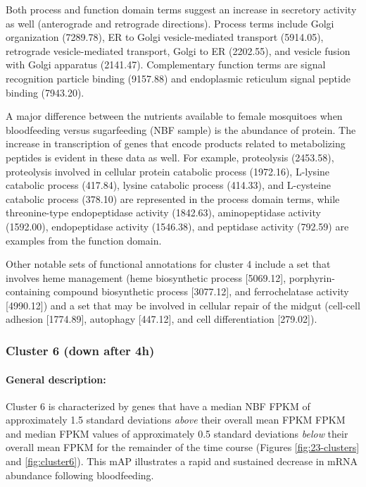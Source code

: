 Both process and function domain terms suggest an increase in secretory activity as well (anterograde and retrograde directions).
%
Process terms include Golgi organization (7289.78), ER to Golgi vesicle-mediated transport (5914.05), retrograde vesicle-mediated transport, Golgi to ER (2202.55), and vesicle fusion with Golgi apparatus (2141.47).
%
Complementary function terms are signal recognition particle binding (9157.88) and endoplasmic reticulum signal peptide binding (7943.20).

A major difference between the nutrients available to female mosquitoes when bloodfeeding versus sugarfeeding (\gls{NBF} sample) is the abundance of protein.
%
The increase in transcription of genes that encode products related to metabolizing peptides is evident in these data as well.
%
For example, proteolysis (2453.58), proteolysis involved in cellular protein catabolic process (1972.16), L-lysine catabolic process (417.84), lysine catabolic process (414.33), and L-cysteine catabolic process (378.10) are represented in the process domain terms, while threonine-type endopeptidase activity (1842.63), aminopeptidase activity (1592.00), endopeptidase activity (1546.38), and peptidase activity (792.59) are examples from the function domain.

Other notable sets of functional annotations for cluster 4 include a set that involves heme management (heme biosynthetic process [5069.12], porphyrin-containing compound biosynthetic process [3077.12], and ferrochelatase activity [4990.12]) and a set that may be involved in cellular repair of the midgut (cell-cell adhesion [1774.89], autophagy [447.12], and cell differentiation [279.02]).







\subsubsection{Cluster 6 (down after 4h)}

\paragraph*{General description:}

Cluster 6 is characterized by genes that have a median \gls{NBF} \gls{FPKM} of approximately 1.5 standard deviations \textit{above} their overall mean \gls{FPKM} \gls{FPKM} and median \gls{FPKM} values of approximately 0.5 standard deviations \textit{below} their overall mean \gls{FPKM} for the remainder of the time course (Figures \ref{fig:23-clusters} and \ref{fig:cluster6}).
%
This \gls{mAP} illustrates a rapid and sustained decrease in mRNA abundance following bloodfeeding.
%



